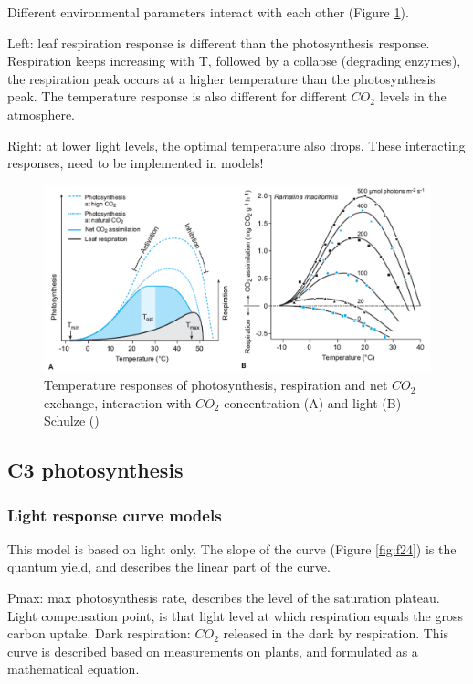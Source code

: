 \documentclass[12pt,oneside]{book}
\begin{document}
Different environmental parameters interact with each other (Figure
\ref{fig:f23}).

Left: leaf respiration response is different than the photosynthesis
response. Respiration keeps increasing with T, followed by a collapse
(degrading enzymes), the respiration peak occurs at a higher temperature
than the photosynthesis peak. The temperature response is also different
for different \(CO_2\) levels in the atmosphere.

Right: at lower light levels, the optimal temperature also drops. These
interacting responses, need to be implemented in models!

\begin{figure}

{\centering \includegraphics[width=0.8\linewidth]{figures/chap2/Trespons_interactions} 

}

\caption{Temperature responses of photosynthesis, respiration and net $CO_2$ exchange, interaction with $CO_2$ concentration (A) and light  (B)  Schulze ()}\label{fig:f23}
\end{figure}

\subsection{C3 photosynthesis}\label{c3-photosynthesis}

\subsubsection{Light response curve
models}\label{light-response-curve-models}

This model is based on light only. The slope of the curve (Figure
\ref{fig:f24}) is the quantum yield, and describes the linear part of
the curve.

Pmax: max photosynthesis rate, describes the level of the saturation
plateau. Light compensation point, is that light level at which
respiration equals the gross carbon uptake. Dark respiration: \(CO_2\)
released in the dark by respiration. This curve is described based on
measurements on plants, and formulated as a mathematical equation.
\end{document}
